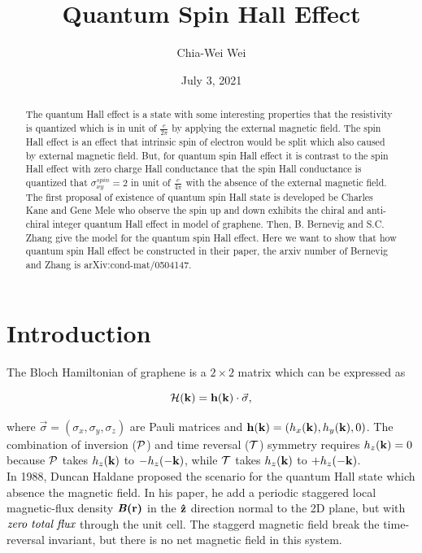 \documentclass[12pt,a4paper]{article}
\title{Quantum Spin Hall Effect}
\author{Chia-Wei Wei}
\date{July 3, 2021}
\begin{document}
\maketitle

\begin{abstract}

The quantum Hall effect is a state with some interesting properties that the
resistivity is quantized which is in unit of $\frac{e}{2\pi} $ by applying 
the external magnetic field. The spin Hall effect is an effect that 
intrinsic spin of electron would be split which also caused by external 
magnetic field. But, for quantum spin Hall effect
it is contrast to the 
spin Hall effect with zero charge Hall conductance that the spin Hall 
conductance is quantized that $\sigma^{spin}_{xy}=2$ in unit of  
$\frac{e}{4\pi}$ with the absence of the external magnetic field.
The first proposal of existence of quantum spin Hall
state\cite{PhysRevLett.95.226801} is developed be
Charles Kane and Gene Mele who observe the spin up and down exhibits the 
chiral and  anti-chiral integer quantum Hall effect in model of graphene. 
Then, B. Bernevig and S.C. Zhang\cite{PhysRevLett.96.106802} give the model 
for the quantum spin Hall 
effect. Here we want to show that how quantum spin Hall effect be constructed 
in their paper, the arxiv number of Bernevig and Zhang is 
arXiv:cond-mat/0504147.

\end{abstract}


\section*{Introduction}%
\label{sec:introduction}
\indent
The Bloch Hamiltonian of graphene is a $2\times 2$ matrix which can be
expressed as 

\begin{equation*}
	    {\cal H}({\bf k}) = {\bf h}({\bf k}) \cdot \vec \sigma,
	    \label{dirac}
\end{equation*}

\noindent
where $\vec\sigma = (\sigma_{x},\sigma_{y},\sigma_{z})$ are Pauli matrices
and ${\bf h}({\bf k}) = (h_x({\bf k}),h_y({\bf k}),0)$.  The
combination of inversion ($\cal P$) and time reversal ($\cal T$) symmetry 
requires $h_z({\bf k})=0$ because $\cal P$ takes $h_z({\bf k})$ to 
$-h_z(-{\bf k})$, while $\cal T$ takes $h_z({\bf k})$ to $+h_z(-{\bf
k})$.\\  

In 1988, Duncan Haldane\cite{PhysRevLett.61.2015} proposed the scenario 
for the quantum Hall state
which absence the magnetic field. In his paper, he add a periodic staggered 
local magnetic-flux density $\textbf{\emph{B}(r)}$ in the ${\bf \hat{z}}$
direction normal to the 2D plane, but with $\emph{zero total flux}$ through
the unit cell. The staggerd magnetic field break the time-reversal invariant,
but there is no net magnetic field in this system. 
\end{document}

